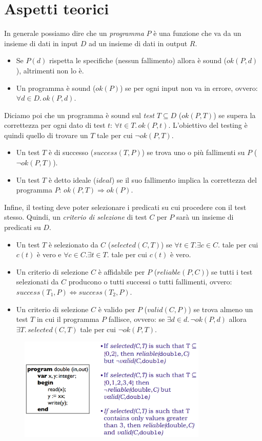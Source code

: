 \documentclass[a4paper,oneside,titlepage]{book}
\begin{document}
\section{Aspetti teorici}
In generale possiamo dire che un \textit{programma} $P$ è una funzione che va da un insieme di dati in input $D$ ad un insieme di dati in output $R$.
\begin{itemize}
    \item Se $P(d)$ rispetta le specifiche (nessun fallimento) allora è sound ($ok(P,d)$), altrimenti non lo è.
    \item Un programma è sound ($ok(P)$) se per ogni input non va in errore, ovvero: $\forall d \in D. \, ok(P,d)$.
\end{itemize}
Diciamo poi che un programma è sound sul \textit{test} $T \subseteq D$ ($ok(P,T)$) se supera la correttezza per ogni dato di test $t$: $\forall t \in T. \, ok(P,t)$. L'obiettivo del testing è quindi quello di trovare un $T$ tale per cui $\neg ok(P,T)$.
\begin{itemize}
    \item Un test $T$ è di successo ($success(T,P)$) se trova uno o più fallimenti su $P$ ($\neg ok(P,T)$).
    \item Un test $T$ è detto ideale ($ideal$) se il suo fallimento implica la
correttezza del programma $P$: $ok(P,T) \Rightarrow ok(P)$.
\end{itemize}
Infine, il testing deve poter selezionare i predicati su cui procedere con il test stesso. Quindi, un \textit{criterio di selezione} di test $C$ per $P$ sarà un insieme di predicati su $D$.
\begin{itemize}
    \item Un test $T$ è selezionato da $C$ ($selected(C,T)$) se $\forall t \in T. \exists c \in C.$ tale per cui $c(t)$ è vero e $\forall c \in C. \exists t \in T.$ tale per cui $c(t)$ è vero.
    \item Un criterio di selezione $C$ è affidabile per $P$ ($reliable(P,C)$) se tutti i test selezionati da $C$ producono o tutti successi o tutti fallimenti, ovvero: $success(T_1,P) \Leftrightarrow success(T_2,P)$.
    \item Un criterio di selezione $C$ è valido per $P$ ($valid(C,P)$) se trova almeno un test $T$ in cui il programma $P$ fallisce, ovvero: se $\exists d \in d. \, \neg ok(P,d)$ allora $\exists T. \, selected(C,T)$ tale per cui $\neg ok(P,T)$.
\end{itemize}
\begin{figure}[htp]
	\centering
	\includegraphics[width=0.8\textwidth]{testing3.png}
\end{figure}
\end{document}
